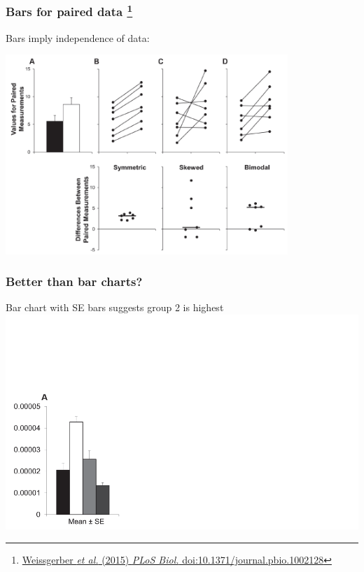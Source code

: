 \begin{frame}
  \frametitle{Bars for paired data
  \footnote{\tiny{\href{http://dx.doi.org/10.1371/journal.pbio.1002128}{Weissgerber \textit{et al.} (2015) \textit{PLoS Biol.} doi:10.1371/journal.pbio.1002128}}}
  }
    \begin{alertblock}{Bars imply independence of data:}
    \end{alertblock}
    \begin{center}
      \includegraphics[width=0.8\textwidth]{images/weissgerber4}  
    \end{center}
\end{frame}

\begin{frame}
  \frametitle{Better than bar charts?}
  \textcolor{hutton_green}{Bar chart with SE bars suggests group 2 is highest}
    \includegraphics[width=1\textwidth]{images/weissgerber_bar_scatter1}    
\end{frame}

